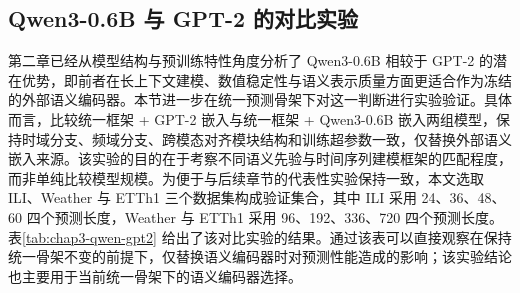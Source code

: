 \subsection{Qwen3-0.6B 与 GPT-2 的对比实验}
第二章已经从模型结构与预训练特性角度分析了 Qwen3-0.6B 相较于 GPT-2 的潜在优势，即前者在长上下文建模、数值稳定性与语义表示质量方面更适合作为冻结的外部语义编码器。本节进一步在统一预测骨架下对这一判断进行实验验证。具体而言，比较统一框架 + GPT-2 嵌入与统一框架 + Qwen3-0.6B 嵌入两组模型，保持时域分支、频域分支、跨模态对齐模块结构和训练超参数一致，仅替换外部语义嵌入来源。该实验的目的在于考察不同语义先验与时间序列建模框架的匹配程度，而非单纯比较模型规模。为便于与后续章节的代表性实验保持一致，本文选取 ILI、Weather 与 ETTh1 三个数据集构成验证集合，其中 ILI 采用 24、36、48、60 四个预测长度，Weather 与 ETTh1 采用 96、192、336、720 四个预测长度。表\ref{tab:chap3-qwen-gpt2} 给出了该对比实验的结果。通过该表可以直接观察在保持统一骨架不变的前提下，仅替换语义编码器时对预测性能造成的影响；该实验结论也主要用于当前统一骨架下的语义编码器选择。

